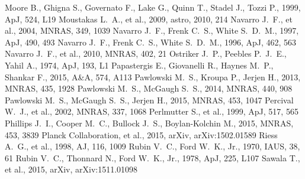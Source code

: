 \documentclass[a4wide,12pt]{book}
\begin{document}
{\begin{thebibliography}{}
Moore B., Ghigna S., Governato F., Lake G., Quinn T., Stadel J., Tozzi P., 
1999, ApJ, 524, L19 
 Moustakas L.~A., et al., 2009, astro, 
2010, 214 
 Navarro J.~F., et al., 2004, MNRAS, 349, 
1039
 Navarro J.~F., Frenk C.~S., White S.~D.~M., 1997, ApJ, 490, 493
 Navarro J.~F., Frenk C.~S., White S.~D.~M., 1996, ApJ, 462, 563 
 Navarro J.~F., et al., 2010, MNRAS, 402, 
21
 Ostriker J.~P., Peebles P.~J.~E., Yahil A., 1974, ApJ, 193, L1 
 Papastergis E., Giovanelli R., Haynes M.~P., Shankar F., 2015, A\&A, 574, A113 
 Pawlowski M.~S., Kroupa P., Jerjen H., 2013, MNRAS, 435, 1928 
 Pawlowski M.~S., McGaugh S.~S., 2014, MNRAS, 440, 908 
 Pawlowski M.~S., McGaugh S.~S., Jerjen H., 2015, MNRAS, 453, 1047 
 Percival W.~J., et al., 2002, MNRAS, 337, 
1068 
 Perlmutter S., et al., 1999, ApJ, 517, 565 
 Phillips J.~I., Cooper M.~C., Bullock 
J.~S., Boylan-Kolchin M., 2015, MNRAS, 453, 3839 
 Planck Collaboration, et al., 2015, arXiv, 
arXiv:1502.01589 
Riess A.~G., et al., 1998, AJ, 116, 1009 
 Rubin V.~C., Ford W.~K., Jr., 1970, IAUS, 38, 61
 Rubin V.~C., Thonnard N., Ford W.~K., Jr., 1978, ApJ, 225, L107 
Sawala T., et al., 2015, arXiv, arXiv:1511.01098 

\end{thebibliography}}
\end{document}
